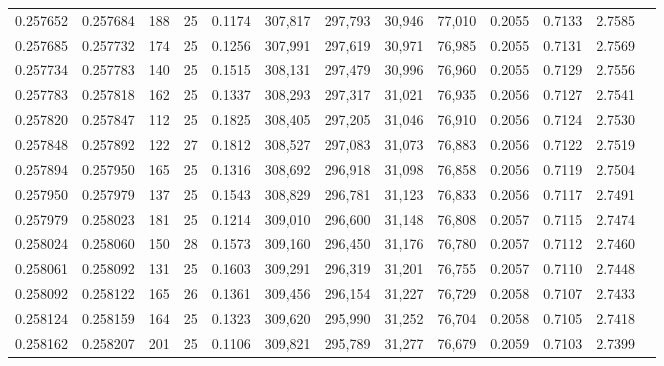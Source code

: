 \begin{tabular}{rrrrrrrrrrrrr}
0.257652 & 0.257684 &   188 &  25 &                                     0.1174 & 307,817 & 297,793 &  30,946 &  77,010 & 0.2055 & 0.7133 & 2.7585 \\
0.257685 & 0.257732 &   174 &  25 &                                     0.1256 & 307,991 & 297,619 &  30,971 &  76,985 & 0.2055 & 0.7131 & 2.7569 \\
0.257734 & 0.257783 &   140 &  25 &                                     0.1515 & 308,131 & 297,479 &  30,996 &  76,960 & 0.2055 & 0.7129 & 2.7556 \\
0.257783 & 0.257818 &   162 &  25 &                                     0.1337 & 308,293 & 297,317 &  31,021 &  76,935 & 0.2056 & 0.7127 & 2.7541 \\
0.257820 & 0.257847 &   112 &  25 &                                     0.1825 & 308,405 & 297,205 &  31,046 &  76,910 & 0.2056 & 0.7124 & 2.7530 \\
0.257848 & 0.257892 &   122 &  27 &                                     0.1812 & 308,527 & 297,083 &  31,073 &  76,883 & 0.2056 & 0.7122 & 2.7519 \\
0.257894 & 0.257950 &   165 &  25 &                                     0.1316 & 308,692 & 296,918 &  31,098 &  76,858 & 0.2056 & 0.7119 & 2.7504 \\
0.257950 & 0.257979 &   137 &  25 &                                     0.1543 & 308,829 & 296,781 &  31,123 &  76,833 & 0.2056 & 0.7117 & 2.7491 \\
0.257979 & 0.258023 &   181 &  25 &                                     0.1214 & 309,010 & 296,600 &  31,148 &  76,808 & 0.2057 & 0.7115 & 2.7474 \\
0.258024 & 0.258060 &   150 &  28 &                                     0.1573 & 309,160 & 296,450 &  31,176 &  76,780 & 0.2057 & 0.7112 & 2.7460 \\
0.258061 & 0.258092 &   131 &  25 &                                     0.1603 & 309,291 & 296,319 &  31,201 &  76,755 & 0.2057 & 0.7110 & 2.7448 \\
0.258092 & 0.258122 &   165 &  26 &                                     0.1361 & 309,456 & 296,154 &  31,227 &  76,729 & 0.2058 & 0.7107 & 2.7433 \\
0.258124 & 0.258159 &   164 &  25 &                                     0.1323 & 309,620 & 295,990 &  31,252 &  76,704 & 0.2058 & 0.7105 & 2.7418 \\
0.258162 & 0.258207 &   201 &  25 &                                     0.1106 & 309,821 & 295,789 &  31,277 &  76,679 & 0.2059 & 0.7103 & 2.7399 \\

\end{tabular}
